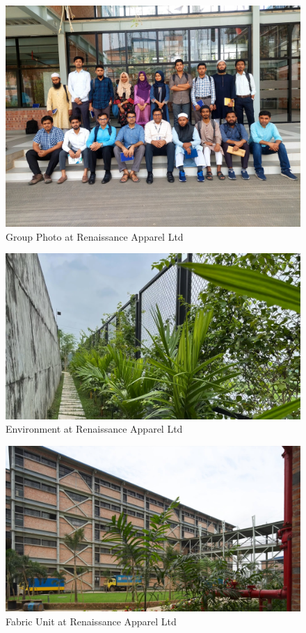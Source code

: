 \documentclass[12pt]{article}
\begin{document}
\begin{appendices}
    \begin{figure}[h!]
        \centering
        \includegraphics[width=0.8\linewidth]{figs/group_pic_ral.jpg}
        \caption{Group Photo at Renaissance Apparel Ltd}
        \label{fig:group_pic_ral}
    \end{figure}

    \begin{figure}[h!]
        \centering
        \includegraphics[width=0.8\linewidth]{figs/environment.jpg}
        \caption{Environment at Renaissance Apparel Ltd}
        \label{fig:environment}
    \end{figure}

    \begin{figure}[h!]
        \centering
        \includegraphics[width=0.8\linewidth]{figs/fabric_unit.jpg}
        \caption{Fabric Unit at Renaissance Apparel Ltd}
        \label{fig:Fabric Unit}
    \end{figure}

\end{appendices}
\clearpage


\end{document}
